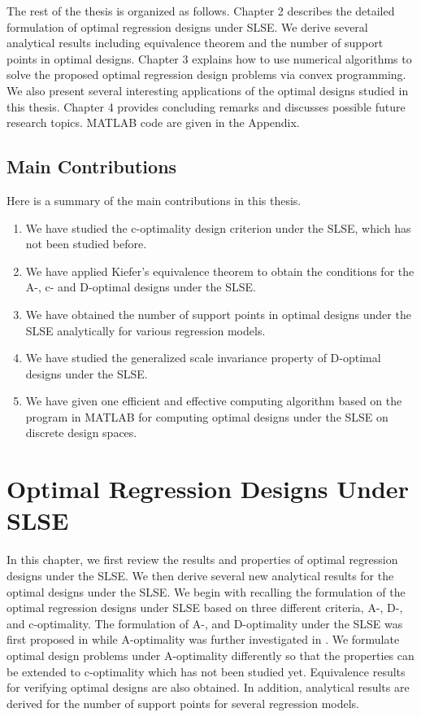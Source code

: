 \documentclass[
]{book}
\theoremstyle{definition}
\theoremstyle{definition}
\theoremstyle{definition}
\theoremstyle{definition}
\theoremstyle{remark}
\begin{document}
The rest of the thesis is organized as follows. Chapter 2 describes the detailed formulation of optimal regression designs under SLSE. We derive several analytical results including equivalence theorem and the number of support points in optimal designs. Chapter 3 explains how to use numerical algorithms to solve the proposed optimal regression design problems via convex programming. We also present several interesting applications of the optimal designs studied in this thesis. Chapter 4 provides concluding remarks and discusses possible future research topics. MATLAB code are given in the Appendix.

\hypertarget{main-contributions}{%
\section{Main Contributions}\label{main-contributions}}

Here is a summary of the main contributions in this thesis.

\begin{enumerate}
\def\labelenumi{\arabic{enumi}.}
\item
  We have studied the c-optimality design criterion under the SLSE, which has not been studied before.
\item
  We have applied Kiefer's equivalence theorem \citep{kiefer1974general} to obtain the conditions for the A-, c- and D-optimal designs under the SLSE.
\item
  We have obtained the number of support points in optimal designs under the SLSE analytically for various regression models.
\item
  We have studied the generalized scale invariance property of D-optimal designs under the SLSE.
\item
  We have given one efficient and effective computing algorithm based on the program in MATLAB for computing optimal designs under the SLSE on discrete design spaces.
\end{enumerate}

\hypertarget{chapter-SLSE}{%
\chapter{Optimal Regression Designs Under SLSE}\label{chapter-SLSE}}

In this chapter, we first review the results and properties of optimal regression designs under the SLSE. We then derive several new analytical results for the optimal designs under the SLSE. We begin with recalling the formulation of the optimal regression designs under SLSE based on three different criteria, A-, D-, and c-optimality. The formulation of A-, and D-optimality under the SLSE was first proposed in \citet{gao2014new} while A-optimality was further investigated in \citet{yin2018optimal}. We formulate optimal design problems under A-optimality differently so that the properties can be extended to c-optimality which has not been studied yet. Equivalence results for verifying optimal designs are also obtained. In addition, analytical results are derived for the number of support points for several regression models.
\end{document}
